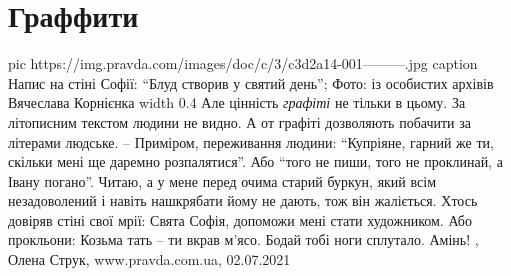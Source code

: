  
 
 
 
 
\chapter{Граффити}

\ifcmt
  pic https://img.pravda.com/images/doc/c/3/c3d2a14-001---------.jpg
	caption Напис на стіні Софії: \enquote{Блуд створив у святий день}; Фото: із особистих архівів Вячеслава Корнієнка
	width 0.4
\fi
Але цінність \emph{графіті} не тільки в цьому. За літописним текстом людини не
видно.  А от графіті дозволяють побачити за літерами людське.  – Приміром,
переживання людини: \enquote{Купріяне, гарний же ти, скільки мені ще даремно
розпалятися}. Або \enquote{того не пиши, того не проклинай, а Івану погано}.
Читаю, а у мене перед очима старий буркун, який всім незадоволений і навіть
нашкрябати йому не дають, тож він жаліється.  Хтось довіряв стіні свої мрії:
Свята Софія, допоможи мені стати художником.  Або прокльони: Козьма тать – ти
вкрав м'ясо. Бодай тобі ноги сплутало. Амінь!
, 
Олена Струк, www.pravda.com.ua, 02.07.2021 

